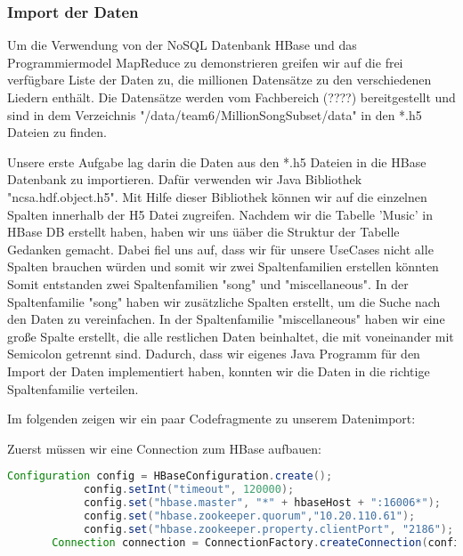 \subsubsection{Import der Daten}
Um die Verwendung von der NoSQL Datenbank HBase und das Programmiermodel MapReduce zu demonstrieren greifen wir auf die frei verfügbare Liste der Daten zu, die millionen Datensätze zu den verschiedenen Liedern enthält. Die Datensätze werden vom Fachbereich (????) bereitgestellt und sind in dem Verzeichnis "/data/team6/MillionSongSubset/data" in den *.h5 Dateien zu finden. 

Unsere erste Aufgabe lag darin die Daten aus den *.h5 Dateien in die HBase Datenbank zu importieren.
Dafür verwenden wir Java Bibliothek "ncsa.hdf.object.h5". Mit Hilfe dieser Bibliothek können wir auf die einzelnen Spalten innerhalb der H5 Datei zugreifen.
Nachdem wir die Tabelle 'Music' in HBase DB erstellt haben, haben wir uns üäber die Struktur der Tabelle Gedanken gemacht. Dabei fiel uns auf, dass wir für unsere UseCases nicht alle Spalten brauchen würden und somit wir zwei Spaltenfamilien erstellen könnten Somit entstanden zwei Spaltenfamilien "song" und "miscellaneous". In der Spaltenfamilie "song" haben wir zusätzliche Spalten erstellt, um die Suche nach den Daten zu vereinfachen. In der Spaltenfamilie "miscellaneous" haben wir eine große Spalte erstellt, die alle restlichen Daten beinhaltet, die mit voneinander mit Semicolon getrennt sind.
Dadurch, dass wir eigenes Java Programm für den Import der Daten implementiert haben, konnten wir die Daten in die richtige Spaltenfamilie verteilen.

Im folgenden zeigen wir ein paar Codefragmente zu unserem Datenimport:

Zuerst müssen wir eine Connection zum HBase aufbauen:



\begin{lstlisting}[language=Java]
Configuration config = HBaseConfiguration.create();
            config.setInt("timeout", 120000);
            config.set("hbase.master", "*" + hbaseHost + ":16006*");
            config.set("hbase.zookeeper.quorum","10.20.110.61");
            config.set("hbase.zookeeper.property.clientPort", "2186");
	   Connection connection = ConnectionFactory.createConnection(config);
\end{lstlisting}

